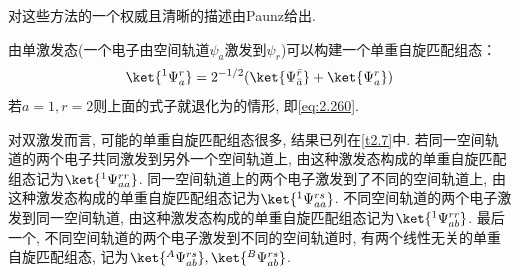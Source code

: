 对这些方法的一个权威且清晰的描述由Paunz给出.


由单激发态(一个电子由空间轨道$\psi_a$激发到$\psi_r$)可以构建一个单重自旋匹配组态：
\begin{align}
\ket{^1\Psi_a^r} = 2^{-1/2}(\ket{\Psi_{\bar{a}}^{\bar{r}}} + \ket{\Psi_a^r})
\end{align}
若$a=1,r=2$则上面的式子就退化为的情形, 
即\autoref{eq:2.260}.


对双激发而言, 
可能的单重自旋匹配组态很多, 
结果已列在\autoref{t2.7}中. 
若同一空间轨道的两个电子共同激发到另外一个空间轨道上, 
由这种激发态构成的单重自旋匹配组态记为$\ket{^1\Psi_{aa}^{rr}}$. 
同一空间轨道上的两个电子激发到了不同的空间轨道上, 
由这种激发态构成的单重自旋匹配组态记为$\ket{^1\Psi_{aa}^{rs}}$. 
不同空间轨道的两个电子激发到同一空间轨道, 
由这种激发态构成的单重自旋匹配组态记为$\ket{^1\Psi_{ab}^{rr}}$. 
最后一个, 
不同空间轨道的两个电子激发到不同的空间轨道时, 
有两个线性无关的单重自旋匹配组态, 
记为$\ket{^A\Psi_{ab}^{rs}}, \ket{^B\Psi_{ab}^{rs}}$.


